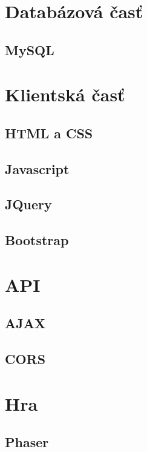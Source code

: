 \section{Databázová časť}

\subsection{MySQL}

\section{Klientská časť}

\subsection{HTML a CSS}

\subsection{Javascript}

\subsection{JQuery}

\subsection{Bootstrap}

\section{API}

\subsection{AJAX}

\subsection{CORS}

\section{Hra}

\subsection{Phaser}

